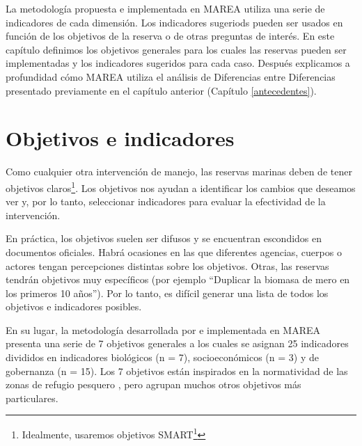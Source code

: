 \documentclass[]{krantz}
\renewcommand{\href}[2]{#2\footnote{\url{#1}}}
\begin{document}
La metodología propuesta e implementada en MAREA utiliza una serie de
indicadores de cada dimensión. Los indicadores sugeriods pueden ser
usados en función de los objetivos de la reserva o de otras preguntas de
interés. En este capítulo definimos los objetivos generales para los
cuales las reservas pueden ser implementadas y los indicadores sugeridos
para cada caso. Después explicamos a profundidad cómo MAREA utiliza el
análisis de Diferencias entre Diferencias presentado previamente en el
capítulo anterior (Capítulo \ref{antecedentes}).

\hypertarget{objetivos-e-indicadores}{%
\section{Objetivos e indicadores}\label{objetivos-e-indicadores}}

Como cualquier otra intervención de manejo, las reservas marinas deben
de tener objetivos claros\footnote{Idealmente, usaremos objetivos
  \href{https://en.wikipedia.org/wiki/SMART_criteria}{SMART}}. Los
objetivos nos ayudan a identificar los cambios que deseamos ver y, por
lo tanto, seleccionar indicadores para evaluar la efectividad de la
intervención.

En práctica, los objetivos suelen ser difusos y se encuentran escondidos
en documentos oficiales. Habrá ocasiones en las que diferentes agencias,
cuerpos o actores tengan percepciones distintas sobre los objetivos.
Otras, las reservas tendrán objetivos muy específicos (por ejemplo
``Duplicar la biomasa de mero en los primeros 10 años''). Por lo tanto,
es difícil generar una lista de todos los objetivos e indicadores
posibles.

En su lugar, la metodología desarrollada por
\citet{villasenorderbez_2018} e implementada en MAREA presenta una serie
de 7 objetivos generales a los cuales se asignan 25 indicadores
divididos en indicadores biológicos (n = 7), socioeconómicos (n = 3) y
de gobernanza (n = 15). Los 7 objetivos están inspirados en la
normatividad de las zonas de refugio pesquero \citep{nom}, pero agrupan
muchos otros objetivos más particulares.
\end{document}
